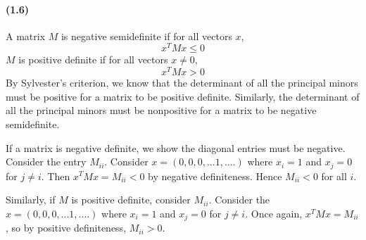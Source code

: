 \documentclass[10pt,letter]{article}
\begin{document}
\paragraph{(1.6)}
A matrix $M$ is negative semidefinite if for all vectors $x$,
\[ x^TMx \le 0 \]
$M$ is positive definite if for all vectors $x \neq 0$,
\[ x^T M x > 0 \]
By Sylvester's criterion, we know that the determinant of all the principal minors must be positive for a matrix to be positive definite. Similarly, the determinant of all the principal minors must be nonpositive for a matrix to be negative semidefinite.

If a matrix is negative definite, we show the diagonal entries must be negative. Consider the entry $M_{ii}$. Consider $x = (0, 0, 0, ... 1, ....)$ where $x_i = 1$ and $x_{j} = 0$ for $j \neq i$. Then $x^T M x = M_{ii} < 0$ by negative definiteness. Hence $M_{ii} < 0$ for all $i$.

Similarly, if $M$ is positive definite, consider $M_{ii}$. Consider the $x = (0, 0, 0, ... 1, ....)$ where $x_i = 1$ and $x_{j} = 0$ for $j \neq i$. Once again, $x^T M x = M_{ii}$, so by positive definiteness, $M_{ii} > 0$.
\end{document}
